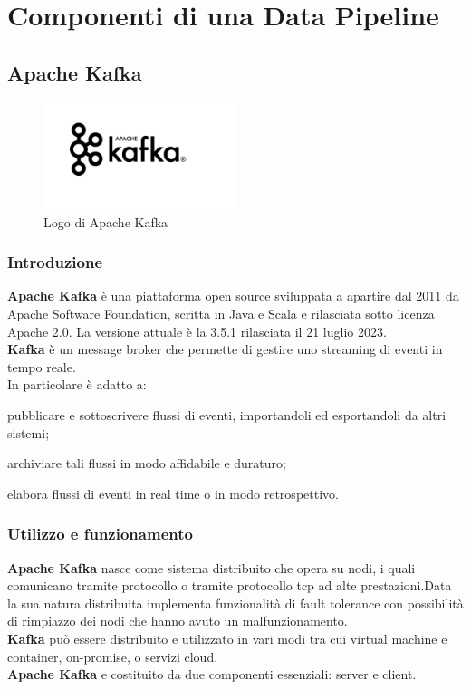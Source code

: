 \chapter{Componenti di una Data Pipeline}\label{cap:Componenti di una Data Pipeline}
\section{Apache Kafka}
\begin{figure}[h]
    \centering
    \includegraphics[width=0.5\textwidth]{images/componenti/logo_kafka.png}
    \caption{Logo di Apache Kafka}
    \label{fig:logo_kafka}
\end{figure}
\subsection{Introduzione}
\textbf{Apache Kafka} è una piattaforma open source sviluppata a apartire dal 2011 da Apache Software Foundation, scritta in Java e Scala e rilasciata sotto licenza Apache 2.0. La versione attuale è la 3.5.1 rilasciata il 21 luglio 2023.\\
\textbf{Kafka} è un \gls{message broker} che permette di gestire uno \gls{streaming di eventi}{} in tempo reale. \\ 
In particolare è adatto a:
\begin{list}{*}{}
    \item pubblicare e sottoscrivere flussi di eventi, importandoli ed esportandoli da altri sistemi;
    \item archiviare tali flussi in modo affidabile e duraturo;
    \item elabora flussi di eventi in real time o in modo retrospettivo.
\end{list}
\pagebreak
\subsection{Utilizzo e funzionamento}
\textbf{Apache Kafka} nasce come sistema distribuito che opera su nodi, i quali comunicano tramite protocollo o tramite protocollo
\gls{tcp}{} ad alte prestazioni.Data la sua natura distribuita implementa funzionalità di \gls{fault tolerance}{} con possibilità di rimpiazzo dei nodi che hanno avuto un malfunzionamento.\\  
\textbf{Kafka} può essere distribuito e utilizzato in vari modi tra cui \gls{virtual machine}{} e \gls{container}{}, \gls{on-promise}{}, o servizi cloud.\\
\textbf{Apache Kafka} e costituito da due componenti essenziali: server e client.
